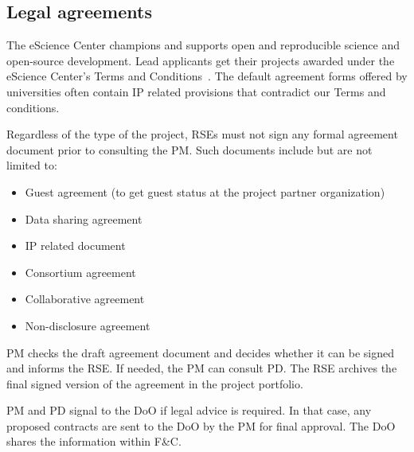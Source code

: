 \subsection{Legal agreements}
\label{sec:init:legal}
The eScience Center champions and supports open and reproducible science and open-source development. Lead applicants
get their projects awarded under the eScience Center's Terms and Conditions~\cite{nlesc-terms}. The default agreement forms offered by universities often contain IP related provisions that contradict
our Terms and conditions.

Regardless of the type of the project, RSEs must not sign any formal agreement document prior to consulting the PM. Such
documents include but are not limited to:
\begin{itemize}
\item Guest agreement (to get guest status at the project partner organization)
\item Data sharing agreement
\item IP related document
\item Consortium agreement
\item Collaborative agreement
\item Non-disclosure agreement
\end{itemize}

PM checks the draft agreement document and decides whether it can be signed and informs the RSE. If needed, the PM can
consult PD. The RSE archives the final signed version of the agreement in the project portfolio.

PM and PD signal to the DoO if legal advice is required. In that case, any proposed contracts are sent to the DoO by the
PM for final approval. The DoO shares the information within F\&C.
